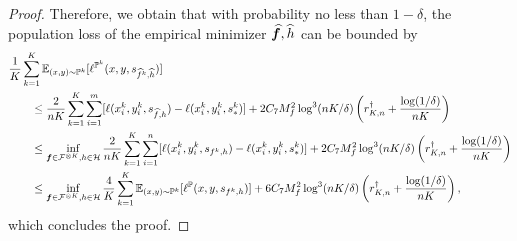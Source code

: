 \documentclass[11pt]{article}
\numberwithin{equation}{section}
\renewcommand{\P}{\mathbb{P}}
\begin{document}
\begin{proof}
    Therefore, we obtain that with probability no less than $1-\delta$, the population loss of the empirical minimizer $\widehat{{\bm{f}}},\widehat{h}$ can be bounded by
    \begin{equation}
        \begin{aligned}
            &\frac{1}{K}\sum_{k=1}^K\E_{(x,y)\sim\P^k}[\ell^{\P^k}(x,y,s_{\widehat{f}^k,\widehat{h}})] \\
            &\qquad\leq \frac{2}{nK}\sum_{k=1}^K\sum_{i=1}^m [\ell(x_i^k,y_i^k,s_{\widehat{f},h})-\ell(x_i^k,y_i^k,s_*^k)] + 2C_7M_f^2\log^3(nK/\delta)\left(r_{K,n}^\dagger+\frac{\log(1/\delta)}{nK}\right) \\
            &\qquad\leq \inf_{\vf\in\mathcal{F}^{\otimes K},h\in\mathcal{H}}\frac{2}{nK}\sum_{k=1}^K\sum_{i=1}^n [\ell(x_i^k,y_i^k,s_{f^k,h})-\ell(x_i^k,y_i^k,s_*^k)] + 2C_7M_f^2\log^3(nK/\delta)\left(r_{K,n}^\dagger+\frac{\log(1/\delta)}{nK}\right) \\
            &\qquad\leq \inf_{\vf\in\mathcal{F}^{\otimes K},h\in\mathcal{H}}\frac{4}{K}\sum_{k=1}^K\E_{(x,y)\sim\P^k}[\ell^\P(x,y,s_{f^k,h})] + 6C_7M_f^2\log^3(nK/\delta)\left(r_{K,n}^\dagger+\frac{\log(1/\delta)}{nK}\right),
        \end{aligned}
    \end{equation}
    which concludes the proof.
\end{proof}
\end{document}
